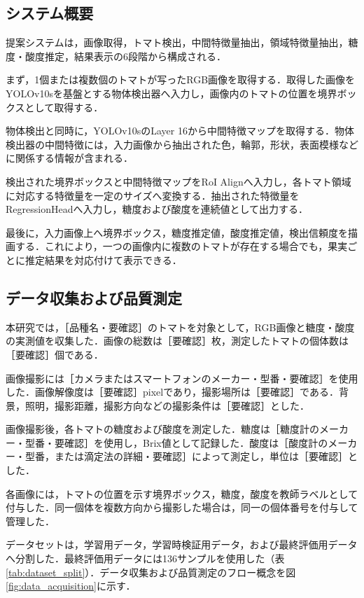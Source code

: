 \documentclass[authorproof,JRM,paper]{fujipressarticle}
\begin{document}
\subsection{システム概要}

提案システムは，画像取得，トマト検出，中間特徴量抽出，領域特徴量抽出，糖度・酸度推定，結果表示の6段階から構成される．

まず，1個または複数個のトマトが写ったRGB画像を取得する．取得した画像をYOLOv10sを基盤とする物体検出器へ入力し，画像内のトマトの位置を境界ボックスとして取得する．

物体検出と同時に，YOLOv10sのLayer 16から中間特徴マップを取得する．物体検出器の中間特徴には，入力画像から抽出された色，輪郭，形状，表面模様などに関係する情報が含まれる．

検出された境界ボックスと中間特徴マップをRoI Alignへ入力し，各トマト領域に対応する特徴量を一定のサイズへ変換する．抽出された特徴量をRegressionHeadへ入力し，糖度および酸度を連続値として出力する．

最後に，入力画像上へ境界ボックス，糖度推定値，酸度推定値，検出信頼度を描画する．これにより，一つの画像内に複数のトマトが存在する場合でも，果実ごとに推定結果を対応付けて表示できる．

\subsection{データ収集および品質測定}

本研究では，［品種名・要確認］のトマトを対象として，RGB画像と糖度・酸度の実測値を収集した．画像の総数は［要確認］枚，測定したトマトの個体数は［要確認］個である．

画像撮影には［カメラまたはスマートフォンのメーカー・型番・要確認］を使用した．画像解像度は［要確認］pixelであり，撮影場所は［要確認］である．背景，照明，撮影距離，撮影方向などの撮影条件は［要確認］とした．

画像撮影後，各トマトの糖度および酸度を測定した．糖度は［糖度計のメーカー・型番・要確認］を使用し，Brix値として記録した．酸度は［酸度計のメーカー・型番，または滴定法の詳細・要確認］によって測定し，単位は［要確認］とした．

各画像には，トマトの位置を示す境界ボックス，糖度，酸度を教師ラベルとして付与した．同一個体を複数方向から撮影した場合は，同一の個体番号を付与して管理した．

データセットは，学習用データ，学習時検証用データ，および最終評価用データへ分割した．最終評価用データには136サンプルを使用した（表\ref{tab:dataset_split}）．データ収集および品質測定のフロー概念を図\ref{fig:data_acquisition}に示す．
\end{document}
